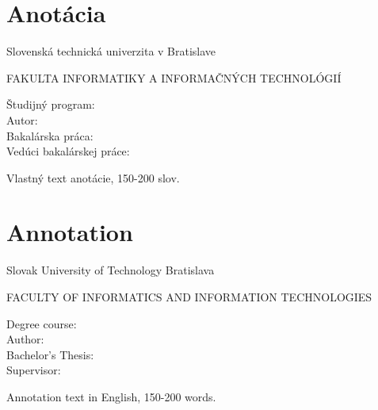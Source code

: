 \thispagestyle{empty}

\section*{Anotácia}

\begin{minipage}[t]{1\columnwidth}%
Slovenská technická univerzita v Bratislave

FAKULTA INFORMATIKY A INFORMAČNÝCH TECHNOLÓGIÍ

Študijný program: \hspace{1.4cm} \myStudyProgramSK\\

\noindent
Autor: \hspace{3.5cm} \myName \\
Bakalárska práca: \hspace{1.5cm} \myTitleSK \\
Vedúci bakalárskej práce: \hspace{0.12cm} \mySupervisor \\
\noindent
\myDateSKBPOne%
\end{minipage}

\bigskip{}

Vlastný text anotácie, 150-200 slov.


\newpage{}\thispagestyle{empty}

\newpage
\thispagestyle{empty}
\mbox{}
\newpage

\thispagestyle{empty}

\section*{Annotation}

\begin{minipage}[t]{1\columnwidth}%
Slovak University of Technology Bratislava

FACULTY OF INFORMATICS AND INFORMATION TECHNOLOGIES

Degree course: \hspace{1.4cm} \myStudyProgramEN\\

\noindent
Author: \hspace{2.6cm} \myName \\
Bachelor's Thesis: \hspace{0.75cm} \myTitleEN \\
Supervisor: \hspace{2cm} \mySupervisor \\
\noindent
\myDateENBPOne%
\end{minipage}

\bigskip{}

Annotation text in English, 150-200 words.

\newpage{}\thispagestyle{empty}\medskip{}


\newpage{}

\newpage
\thispagestyle{empty}
\mbox{}
\newpage
